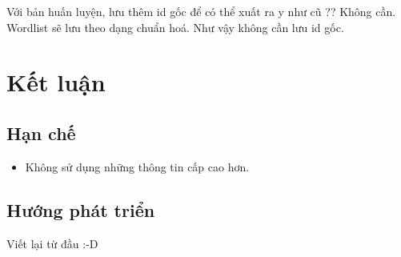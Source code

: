 \documentclass[a4paper]{book} %
\begin{document}
Với bản huấn luyện, lưu thêm id gốc để có thể xuất ra y như cũ ??
Không cần. Wordlist sẽ lưu theo dạng chuẩn hoá. Như vậy không cần lưu
id gốc.

\chapter{Kết luận}
\label{cha:conclusion}

\section{Hạn chế}
\begin{itemize}
\item Không sử dụng những thông tin cấp cao hơn.
\end{itemize}

\section{Hướng phát triển}

Viết lại từ đầu :-D
\end{document}
